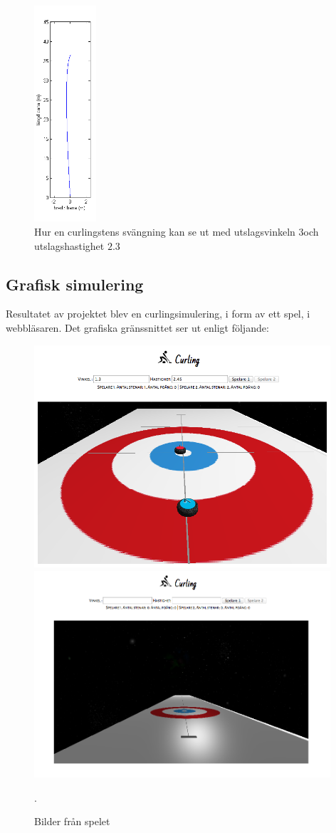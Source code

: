 \documentclass[11pt]{article} %
\begin{document}
\begin{figure}[ht!]
\centering
\includegraphics[width=23mm]{curvMatlab.png}
\caption{Hur en curlingstens svängning kan se ut med utslagsvinkeln $3$\textdegree och utslagshastighet $2.3$}
\label{fig:kurvaMatlab}
\label{overflow}
\end{figure}

\pagebreak

\subsection{Grafisk simulering}
Resultatet av projektet blev en curlingsimulering, i form av ett spel, i webbläsaren. Det grafiska gränssnittet ser ut enligt följande: 

\begin{figure}[ht!]
\centering
\includegraphics[width=110mm]{game4.png}
\includegraphics[width=110mm]{game2.png}
\caption{Bilder från spelet}.
\label{fig:spell}
\label{overflow}
\end{figure}
\end{document}
